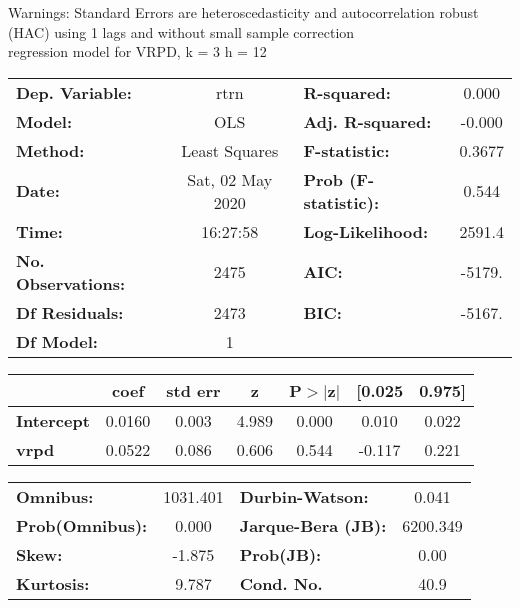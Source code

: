 Warnings: \newline
 [1] Standard Errors are heteroscedasticity and autocorrelation robust (HAC) using 1 lags and without small sample correction\\ 

regression model for VRPD, k = 3 h = 12\begin{center}
\begin{tabular}{lclc}
\toprule
\textbf{Dep. Variable:}    &       rtrn       & \textbf{  R-squared:         } &     0.000   \\
\textbf{Model:}            &       OLS        & \textbf{  Adj. R-squared:    } &    -0.000   \\
\textbf{Method:}           &  Least Squares   & \textbf{  F-statistic:       } &    0.3677   \\
\textbf{Date:}             & Sat, 02 May 2020 & \textbf{  Prob (F-statistic):} &    0.544    \\
\textbf{Time:}             &     16:27:58     & \textbf{  Log-Likelihood:    } &    2591.4   \\
\textbf{No. Observations:} &        2475      & \textbf{  AIC:               } &    -5179.   \\
\textbf{Df Residuals:}     &        2473      & \textbf{  BIC:               } &    -5167.   \\
\textbf{Df Model:}         &           1      & \textbf{                     } &             \\
\bottomrule
\end{tabular}
\begin{tabular}{lcccccc}
                   & \textbf{coef} & \textbf{std err} & \textbf{z} & \textbf{P$> |$z$|$} & \textbf{[0.025} & \textbf{0.975]}  \\
\midrule
\textbf{Intercept} &       0.0160  &        0.003     &     4.989  &         0.000        &        0.010    &        0.022     \\
\textbf{vrpd}      &       0.0522  &        0.086     &     0.606  &         0.544        &       -0.117    &        0.221     \\
\bottomrule
\end{tabular}
\begin{tabular}{lclc}
\textbf{Omnibus:}       & 1031.401 & \textbf{  Durbin-Watson:     } &    0.041  \\
\textbf{Prob(Omnibus):} &   0.000  & \textbf{  Jarque-Bera (JB):  } & 6200.349  \\
\textbf{Skew:}          &  -1.875  & \textbf{  Prob(JB):          } &     0.00  \\
\textbf{Kurtosis:}      &   9.787  & \textbf{  Cond. No.          } &     40.9  \\
\bottomrule
\end{tabular}
\end{center}

